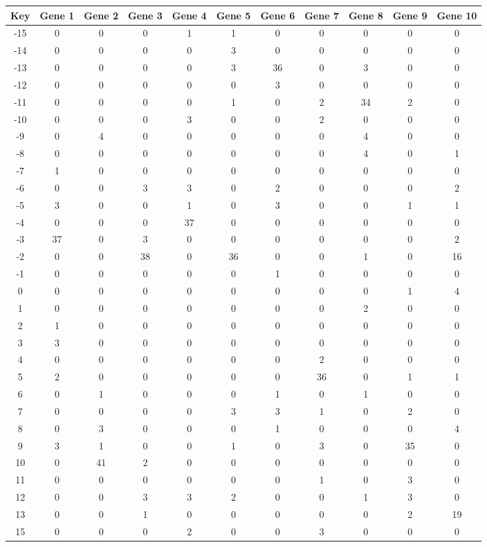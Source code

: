 \begin{tabular}{|c|c|c|c|c|c|c|c|c|c|c|}
\hline
Key & Gene 1 & Gene 2 & Gene 3 & Gene 4 & Gene 5 & Gene 6 & Gene 7 & Gene 8 & Gene 9 & Gene 10 \\
\hline
-15 & 0 & 0 & 0 & 1 & 1 & 0 & 0 & 0 & 0 & 0 \\
-14 & 0 & 0 & 0 & 0 & 3 & 0 & 0 & 0 & 0 & 0 \\
-13 & 0 & 0 & 0 & 0 & 3 & 36 & 0 & 3 & 0 & 0 \\
-12 & 0 & 0 & 0 & 0 & 0 & 3 & 0 & 0 & 0 & 0 \\
-11 & 0 & 0 & 0 & 0 & 1 & 0 & 2 & 34 & 2 & 0 \\
-10 & 0 & 0 & 0 & 3 & 0 & 0 & 2 & 0 & 0 & 0 \\
-9 & 0 & 4 & 0 & 0 & 0 & 0 & 0 & 4 & 0 & 0 \\
-8 & 0 & 0 & 0 & 0 & 0 & 0 & 0 & 4 & 0 & 1 \\
-7 & 1 & 0 & 0 & 0 & 0 & 0 & 0 & 0 & 0 & 0 \\
-6 & 0 & 0 & 3 & 3 & 0 & 2 & 0 & 0 & 0 & 2 \\
-5 & 3 & 0 & 0 & 1 & 0 & 3 & 0 & 0 & 1 & 1 \\
-4 & 0 & 0 & 0 & 37 & 0 & 0 & 0 & 0 & 0 & 0 \\
-3 & 37 & 0 & 3 & 0 & 0 & 0 & 0 & 0 & 0 & 2 \\
-2 & 0 & 0 & 38 & 0 & 36 & 0 & 0 & 1 & 0 & 16 \\
-1 & 0 & 0 & 0 & 0 & 0 & 1 & 0 & 0 & 0 & 0 \\
0 & 0 & 0 & 0 & 0 & 0 & 0 & 0 & 0 & 1 & 4 \\
1 & 0 & 0 & 0 & 0 & 0 & 0 & 0 & 2 & 0 & 0 \\
2 & 1 & 0 & 0 & 0 & 0 & 0 & 0 & 0 & 0 & 0 \\
3 & 3 & 0 & 0 & 0 & 0 & 0 & 0 & 0 & 0 & 0 \\
4 & 0 & 0 & 0 & 0 & 0 & 0 & 2 & 0 & 0 & 0 \\
5 & 2 & 0 & 0 & 0 & 0 & 0 & 36 & 0 & 1 & 1 \\
6 & 0 & 1 & 0 & 0 & 0 & 1 & 0 & 1 & 0 & 0 \\
7 & 0 & 0 & 0 & 0 & 3 & 3 & 1 & 0 & 2 & 0 \\
8 & 0 & 3 & 0 & 0 & 0 & 1 & 0 & 0 & 0 & 4 \\
9 & 3 & 1 & 0 & 0 & 1 & 0 & 3 & 0 & 35 & 0 \\
10 & 0 & 41 & 2 & 0 & 0 & 0 & 0 & 0 & 0 & 0 \\
11 & 0 & 0 & 0 & 0 & 0 & 0 & 1 & 0 & 3 & 0 \\
12 & 0 & 0 & 3 & 3 & 2 & 0 & 0 & 1 & 3 & 0 \\
13 & 0 & 0 & 1 & 0 & 0 & 0 & 0 & 0 & 2 & 19 \\
15 & 0 & 0 & 0 & 2 & 0 & 0 & 3 & 0 & 0 & 0 \\
\hline
\end{tabular}